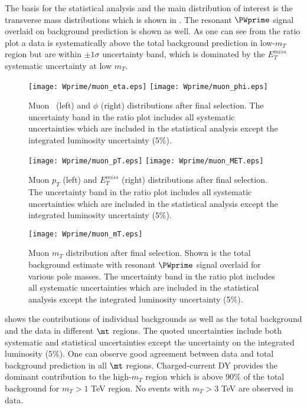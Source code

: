 The basis for the statistical analysis and the main distribution of interest 
is the transverse mass distributions which is shown in .
The resonant $\PWprime$ signal overlaid on background prediction is shown as well.
As one can see from the ratio plot a data is systematically above the total background prediction
in low-$m_T$ region but are within $\pm 1 \sigma$ uncertainty band, which is dominated by the $E_T^{miss}$ systematic uncertainty at low $m_T$.

\begin{figure}[]
  \centering
  \texttt{[image: Wprime/muon\_eta.eps]}
  \texttt{[image: Wprime/muon\_phi.eps]}
  \caption{
  Muon \eta\ (left) and $\phi$ (right) distributions after final selection. The uncertainty band in the ratio plot includes all systematic uncertainties which are included in the statistical analysis except the integrated luminosity uncertainty ($5\%$).
}
  \label{fig:mu_results_etaphi}
\end{figure}

\begin{figure}[]
  \centering
  \texttt{[image: Wprime/muon\_pT.eps]}
  \texttt{[image: Wprime/muon\_MET.eps]}
 \caption{
 Muon $p_T$ (left) and $E_T^{miss}$ (right) distributions after final selection. The uncertainty band in the ratio plot includes all systematic uncertainties which are included in the statistical analysis except the integrated luminosity uncertainty ($5\%$).
}
  \label{fig:mu_results_ptmet}
\end{figure}


\begin{figure}[]
  \centering
  \texttt{[image: Wprime/muon\_mT.eps]}
  \caption{
  Muon $m_T$ distribution after final selection. 
  Shown is the total background estimate with resonant $\PWprime$ signal overlaid for various pole masses. 
  The uncertainty band in the ratio plot includes all systematic uncertainties which are included in the statistical analysis except the integrated luminosity uncertainty (5$\%$).}
  \label{fig:MT_mu_Wprime}
\end{figure}

shows the contributions of individual backgrounds as well as the total background
and the data in different $\mt$ regions. The quoted uncertainties include both systematic and
statistical uncertainties except the uncertainty on the integrated luminosity ($5\%$).
One can observe good agreement between data and total background prediction in all $\mt$ regions. Charged-current DY provides the dominant contribution to the high-$m_T$ region which is above 90$\%$ of the total background for $m_T>1$ TeV region. No events with $m_T > 3$ TeV are
observed in data.

